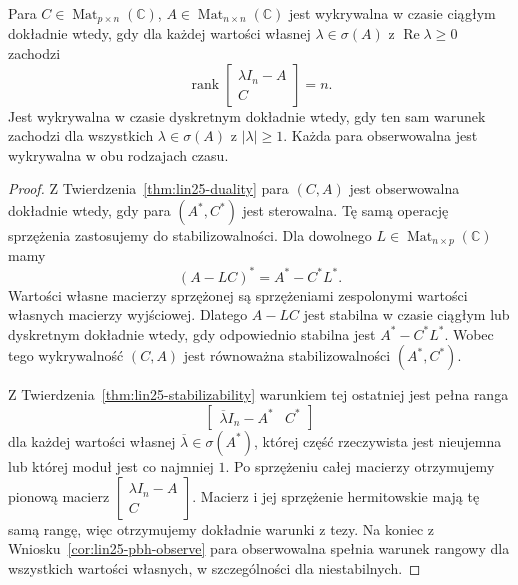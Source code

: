 \begin{twierdzenie}
\label{thm:lin25-detectability}
Para
\(C\in\operatorname{Mat}_{p\times n}(\mathbb C)\),
\(A\in\operatorname{Mat}_{n\times n}(\mathbb C)\)
jest wykrywalna w czasie ciągłym
dokładnie wtedy, gdy
dla każdej wartości własnej
\(\lambda\in\sigma(A)\)
z \(\operatorname{Re}\lambda\ge0\)
zachodzi
\[
 \operatorname{rank}
 \begin{bmatrix}\lambda I_n-A\\C\end{bmatrix}=n.
\]
Jest wykrywalna
w czasie dyskretnym
dokładnie wtedy, gdy
ten sam warunek zachodzi
dla wszystkich
\(\lambda\in\sigma(A)\)
z \(|\lambda|\ge1\).
Każda para obserwowalna
jest wykrywalna
w obu rodzajach czasu.
\end{twierdzenie}
\begin{proof}
Z
Twierdzenia~\ref{thm:lin25-duality}
para \((C,A)\)
jest obserwowalna
dokładnie wtedy, gdy
para \((A^*,C^*)\)
jest sterowalna.
Tę samą operację sprzężenia
zastosujemy do stabilizowalności.
Dla dowolnego
\(L\in\operatorname{Mat}_{n\times p}(\mathbb C)\)
mamy
\[
 (A-LC)^*=A^*-C^*L^*.
\]
Wartości własne
macierzy sprzężonej
są sprzężeniami zespolonymi
wartości własnych
macierzy wyjściowej.
Dlatego \(A-LC\)
jest stabilna w czasie
ciągłym lub dyskretnym
dokładnie wtedy, gdy
odpowiednio stabilna
jest \(A^*-C^*L^*\).
Wobec tego wykrywalność
\((C,A)\) jest równoważna
stabilizowalności
\((A^*,C^*)\).

Z
Twierdzenia~\ref{thm:lin25-stabilizability}
warunkiem tej ostatniej
jest pełna ranga
\[
 \begin{bmatrix}
 \overline{\lambda}I_n-A^*&C^*
 \end{bmatrix}
\]
dla każdej wartości własnej
\(\overline{\lambda}\in\sigma(A^*)\),
której część rzeczywista
jest nieujemna
lub której moduł
jest co najmniej \(1\).
Po sprzężeniu całej macierzy
otrzymujemy pionową
macierz
\(\left[\begin{smallmatrix}
 \lambda I_n-A\\C
 \end{smallmatrix}\right]\).
Macierz i jej sprzężenie
hermitowskie mają tę samą rangę,
więc otrzymujemy dokładnie
warunki z tezy.
Na koniec z
Wniosku~\ref{cor:lin25-pbh-observe}
para obserwowalna
spełnia warunek rangowy
dla wszystkich
wartości własnych,
w szczególności
dla niestabilnych.
\end{proof}


